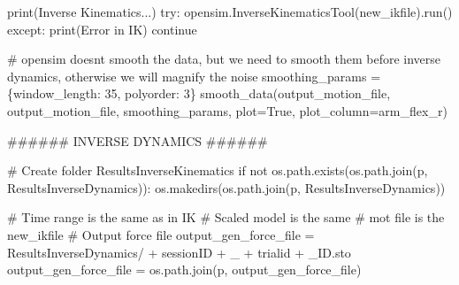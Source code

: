 \documentclass[
  letterpaper,
  DIV=11,
  numbers=noendperiod]{scrreprt}
\newenvironment{Shaded}{\begin{snugshade}}{\end{snugshade}}
\newcommand{\BuiltInTok}[1]{\textcolor[rgb]{0.00,0.23,0.31}{#1}}
\newcommand{\CommentTok}[1]{\textcolor[rgb]{0.37,0.37,0.37}{#1}}
\newcommand{\ControlFlowTok}[1]{\textcolor[rgb]{0.00,0.23,0.31}{#1}}
\newcommand{\DecValTok}[1]{\textcolor[rgb]{0.68,0.00,0.00}{#1}}
\newcommand{\KeywordTok}[1]{\textcolor[rgb]{0.00,0.23,0.31}{#1}}
\newcommand{\NormalTok}[1]{\textcolor[rgb]{0.00,0.23,0.31}{#1}}
\newcommand{\OperatorTok}[1]{\textcolor[rgb]{0.37,0.37,0.37}{#1}}
\newcommand{\StringTok}[1]{\textcolor[rgb]{0.13,0.47,0.30}{#1}}
\newcommand{\VariableTok}[1]{\textcolor[rgb]{0.07,0.07,0.07}{#1}}
\begin{document}
\begin{Shaded}
\begin{Highlighting}[]
            \BuiltInTok{print}\NormalTok{(}\StringTok{\textquotesingle{}Inverse Kinematics...\textquotesingle{}}\NormalTok{)}
            \ControlFlowTok{try}\NormalTok{:}
\NormalTok{                opensim.InverseKinematicsTool(new\_ikfile).run()}
            \ControlFlowTok{except}\NormalTok{:}
                \BuiltInTok{print}\NormalTok{(}\StringTok{\textquotesingle{}Error in IK\textquotesingle{}}\NormalTok{)}
                \ControlFlowTok{continue}

            \CommentTok{\# opensim doesn\textquotesingle{}t smooth the data, but we need to smooth them before inverse dynamics, otherwise we will magnify the noise}
\NormalTok{            smoothing\_params }\OperatorTok{=}\NormalTok{ \{}\StringTok{\textquotesingle{}window\_length\textquotesingle{}}\NormalTok{: }\DecValTok{35}\NormalTok{, }\StringTok{\textquotesingle{}polyorder\textquotesingle{}}\NormalTok{: }\DecValTok{3}\NormalTok{\}}
\NormalTok{            smooth\_data(output\_motion\_file, output\_motion\_file, smoothing\_params, plot}\OperatorTok{=}\VariableTok{True}\NormalTok{, plot\_column}\OperatorTok{=}\StringTok{\textquotesingle{}arm\_flex\_r\textquotesingle{}}\NormalTok{)}

            \CommentTok{\#\#\#\#\#\# INVERSE DYNAMICS \#\#\#\#\#\#}

            \CommentTok{\# Create folder ResultsInverseKinematics}
            \ControlFlowTok{if} \KeywordTok{not}\NormalTok{ os.path.exists(os.path.join(p, }\StringTok{\textquotesingle{}ResultsInverseDynamics\textquotesingle{}}\NormalTok{)):}
\NormalTok{                os.makedirs(os.path.join(p, }\StringTok{\textquotesingle{}ResultsInverseDynamics\textquotesingle{}}\NormalTok{))}

            \CommentTok{\# Time range is the same as in IK}
            \CommentTok{\# Scaled model is the same}
            \CommentTok{\# mot file is the new\_ikfile}
            \CommentTok{\# Output force file}
\NormalTok{            output\_gen\_force\_file }\OperatorTok{=} \StringTok{\textquotesingle{}ResultsInverseDynamics/\textquotesingle{}} \OperatorTok{+}\NormalTok{ sessionID }\OperatorTok{+} \StringTok{\textquotesingle{}\_\textquotesingle{}} \OperatorTok{+}\NormalTok{ trialid }\OperatorTok{+} \StringTok{\textquotesingle{}\_ID.sto\textquotesingle{}}
\NormalTok{            output\_gen\_force\_file }\OperatorTok{=}\NormalTok{ os.path.join(p, output\_gen\_force\_file)}


\end{Highlighting}
\end{Shaded}
\end{document}
